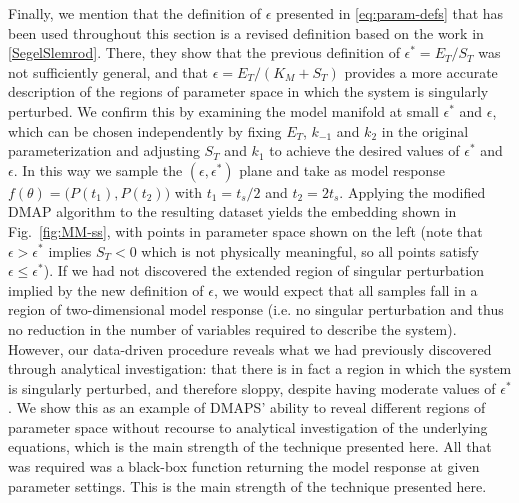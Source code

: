 Finally, we mention that the definition of $\epsilon$ presented in
\eqref{eq:param-defs} that has been used throughout this section is a
revised definition based on the work in \ref{SegelSlemrod}. There,
they show that the previous definition of $\epsilon^* = E_T/S_T$ was
not sufficiently general, and that $\epsilon = E_T/(K_M + S_T)$
provides a more accurate description of the regions of parameter space
in which the system is singularly perturbed. We confirm this by
examining the model manifold at small $\epsilon^*$ and $\epsilon$,
which can be chosen independently by fixing $E_T$, $k_{-1}$ and $k_2$
in the original parameterization and adjusting $S_T$ and $k_1$ to
achieve the desired values of $\epsilon^*$ and $\epsilon$. In this way
we sample the $(\epsilon, \epsilon^*)$ plane and take as model
response $f(\theta) = \big(P(t_1), P(t_2) \big)$ with $t_1 = t_s/2$
and $t_2 = 2 t_s$. Applying the modified DMAP algorithm to the
resulting dataset yields the embedding shown in Fig.~\ref{fig:MM-ss},
with points in parameter space shown on the left (note that
$\epsilon > \epsilon^*$ implies $S_T < 0$ which is not physically
meaningful, so all points satisfy $\epsilon \leq \epsilon^*$). If we
had not discovered the extended region of singular perturbation
implied by the new definition of $\epsilon$, we would expect that all
samples fall in a region of two-dimensional model response (i.e. no
singular perturbation and thus no reduction in the number of variables
required to describe the system). However, our data-driven procedure
reveals what we had previously discovered through analytical
investigation: that there is in fact a region in which the system is
singularly perturbed, and therefore sloppy, despite having moderate
values of $\epsilon^*$. We show this as an example of DMAPS' ability
to reveal different regions of parameter space without recourse to
analytical investigation of the underlying equations, which is the
main strength of the technique presented here. All that was required
was a black-box function returning the model response at given
parameter settings. This is the main strength of the technique
presented here.


